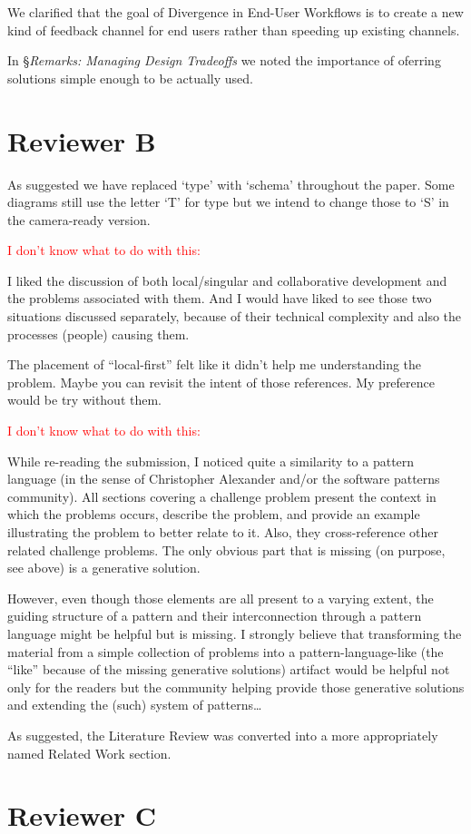 \documentclass{article}
\begin{document}
We clarified that the goal of Divergence in End-User Workflows is to create a new kind of feedback channel for end users rather than speeding up existing channels.

In \S\emph{Remarks: Managing Design Tradeoffs} we noted the importance of oferring solutions simple enough to be actually used.

\section{Reviewer B}

As suggested we have replaced `type' with `schema' throughout the paper. Some diagrams still use the letter `T' for type but we intend to change those to `S' in the camera-ready version.

\textcolor{red}{I don't know what to do with this:}
\begin{displayquote}
I liked the discussion of both local/singular and collaborative development and the problems associated with them. And I would have liked to see those two situations discussed separately, because of their technical complexity and also the processes (people) causing them.

The placement of “local-first” felt like it didn’t help me understanding the problem. Maybe you can revisit the intent of those references. My preference would be try without them.
\end{displayquote}

\textcolor{red}{I don't know what to do with this:}
\begin{displayquote}
  While re-reading the submission, I noticed quite a similarity to a pattern language (in the sense of Christopher Alexander and/or the software patterns community). All sections covering a challenge problem present the context in which the problems occurs, describe the problem, and provide an example illustrating the problem to better relate to it. Also, they cross-reference other related challenge problems. The only obvious part that is missing (on purpose, see above) is a generative solution.

  However, even though those elements are all present to a varying extent, the guiding structure of a pattern and their interconnection through a pattern language might be helpful but is missing. I strongly believe that transforming the material from a simple collection of problems into a pattern-language-like (the “like” because of the missing generative solutions) artifact would be helpful not only for the readers but the community helping provide those generative solutions and extending the (such) system of patterns…
\end{displayquote}

As suggested, the Literature Review was converted into a more appropriately named Related Work section.


\section{Reviewer C}
\end{document}
